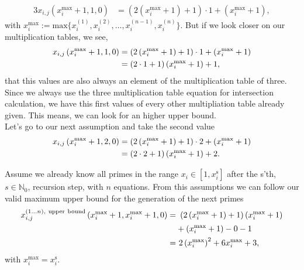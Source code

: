 \begin{enumerate}
	\begin{alignat}{3}
		x_{i,j}\left(x_{i}^{\mathrm{max}} + 1,1,0\right) &= \left(2\left(x_{i}^{\mathrm{max}} + 1\right) + 1\right) \cdot 1 + \left(x_{i}^{\mathrm{max}} + 1\right), \label{eq:firstassumption}
	\end{alignat}
	with $x_{i}^{\mathrm{max}} := \mathrm{max}\{ x_{i}^{\left(1\right)}, x_{i}^{\left(2\right)}, \dots, x_{i}^{\left(n-1\right)}, x_{i}^{\left(n\right)} \}$. But if we look closer on our multiplication tables, we see,
	\begin{alignat}{3}
	x_{i,j}\left(x_{i}^{\mathrm{max}} + 1,1,0\right) &= \left(2\left(x_{i}^{\mathrm{max}} + 1\right) + 1\right) \cdot 1 + \left(x_{i}^{\mathrm{max}} + 1\right) \notag \\
	&= \left(2 \cdot 1 + 1\right)\left(x_{i}^{\mathrm{max}} + 1\right) + 1, \label{eq:firstvalue}
	\end{alignat}
	that this values are also always an element of the multiplication table of three. Since we always use the three multiplication table equation for intersection calculation, we have this first values of every other multipliation table already given. This means, we can look for an higher upper bound. \\

	Let's go to our next assumption and take the second value
	\begin{alignat}{3}
		x_{i,j}\left(x_{i}^{\mathrm{max}} + 1,2,0\right) &= \left(2\left(x_{i}^{\mathrm{max}} + 1\right) + 1\right) \cdot 2 + \left(x_{i}^{\mathrm{max}} + 1\right) \notag \\
	&= \left(2 \cdot 2 + 1\right)\left(x_{i}^{\mathrm{max}} + 1\right) + 2. \label{eq:secondassumption}
	\end{alignat}

	Assume we already know all primes in the range $x_{i} \in [1,x_{i}^{\mathrm{s}}]$ after the s'th, $s \in \mathbb{N}_{0}$, recursion step, with $n$ equations. From this assumptions we can follow our valid maximum upper bound for the generation of the next primes
	\begin{alignat}{3}
		x_{i,j}^{\left(1 \dots n\right), \ \mathrm{upper \ bound}}\left(x_{i}^{\mathrm{max}}+1,x_{i}^{\mathrm{max}} + 1,0\right) =& \ \left(2\left(x_{i}^{\mathrm{max}}+1\right) + 1\right)\left(x_{i}^{\mathrm{max}}+1\right) \notag \\
	&+ \left(x_{i}^{\mathrm{max}}+1\right) - 0 -1 \notag \\
	=& \ 2\left(x_{i}^{\mathrm{max}}\right)^{2} + 6x_{i}^{\mathrm{max}} + 3, \label{eq:upperbound}
	\end{alignat}
	with $x_{i}^{\mathrm{max}} = x_{i}^{\mathrm{s}}$.
\label{it:intbounds35_dis}
\end{enumerate}




